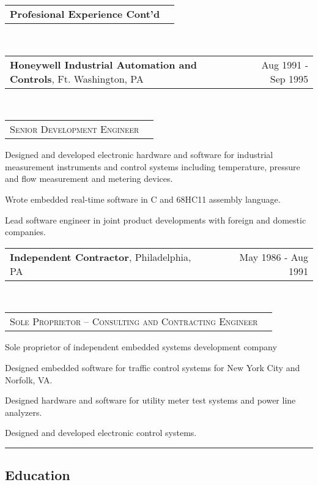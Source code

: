 \documentclass[10pt,letterpaper]{extarticle}
\makeatletter
\newcommand{\headerrow}[2]
{\begin{tabular*}{\linewidth}{l@{\extracolsep{\fill}}r}
	#1 &
	#2 \\
\end{tabular*}}
\makeatother
\begin{document}
	\headerrow
	{\large \textbf{Profesional Experience Cont'd}}
	{}\\
	\headerrow
		{\large \textbf{Honeywell Industrial Automation and Controls}, Ft. Washington, PA}
		{Aug 1991 - Sep 1995}
	\\
	\headerrow
		{\large \textsc{Senior Development Engineer}}
		{}
	\vspace{-2em}\begin{itemize*}
		\item Designed and developed electronic hardware and software for industrial
		measurement instruments and control systems including temperature, pressure and flow
		measurement and metering devices.
		\item Wrote embedded real-time software in C and 68HC11 assembly language.
		\item Lead software engineer in joint product developments with foreign and domestic
		companies.
	\end{itemize*}
	\headerrow
		{\large \textbf{Independent Contractor}, Philadelphia, PA}
		{May 1986 - Aug 1991}
	\\
	\headerrow
		{\large \textsc{Sole Proprietor – Consulting and Contracting Engineer}}
		{}
	\vspace{-2em}\begin{itemize*}
	 \item Sole proprietor of independent embedded systems development company
	 \item Designed embedded software for traffic control systems for New York City and
	 Norfolk, VA.
	 \item Designed hardware and software for utility meter test systems and power line
	 analyzers.
	 \item Designed and developed electronic control systems.
	\end{itemize*}



\hrule
\vspace{-1em}\subsection*{\Large Education}\vspace{-0.5em}
\end{document}
